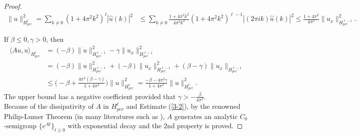 \documentclass[10pt,a4paper,final]{article}
\numberwithin{equation}{section}
\newcommand{\Z}{\mathbb{Z}}
\newcommand{\cF}{\mathcal{F}}
\newcommand{\Gb}{\beta}
\newcommand{\Gg}{\gamma}
\newcommand{\Gl}{\lambda}
\begin{document}
\begin{proof}
\begin{align*}
    \|u\|_{H^{\ell}_{per}}^2=\sum_{k\neq 0} (1+4\pi^2 k^2)^{\ell}|\widehat{u}(k)|^2 &\leq \sum_{k\neq 0} \frac{1+4\pi^2k^2}{4\pi^2k^2} (1+4\pi^2 k^2)^{\ell-1}|(2\pi i k)\widehat{u}(k)|^2\leq \frac{1+4\pi^2}{4\pi^2}\|u_x\|_{H^{\ell-1}_{per}}^2.
\end{align*}


If $\beta\leq 0, \gamma>0$, then 
\begin{align*}
    \langle Au,u\rangle_{H^\ell_{per}}&=(-\beta)\|u\|_{H^{\ell-1}_{per}}^2-\gamma\|u_x\|_{H^{\ell-1}_{per}}^2\\
    &=(-\Gb)\|u\|_{H^{\ell-1}_{per}}^2+(-\Gb)\|u_x\|_{H^{\ell-1}_{per}}^2+(\Gb-\Gg)\|u_x\|_{H^{\ell-1}_{per}} \\&\leq \bigg(-\beta+\frac{4\pi^2(\Gb-\Gg)}{1+4\pi^2}\bigg )\|u\|_{H^{\ell}_{per}}^2=\frac{-\Gb-4\pi^2\Gg}{1+4\pi^2}\|u\|_{H^{\ell}_{per}}^2.
\end{align*}
The upper bound has a negative coefficient provided that $\Gg>-\frac{\Gb}{4\pi^2}$. \\

Because of the dissipativity of $A$ in $H_{per}^\ell$ and Estimate (\ref{3-2}), by the renowned Philip-Lumer Theorem (in many literatures such as \cite{LZ}), $A$ generates an analytic $C_0$-semigroup $\{e^{At}\}_{t\ge0}$ with exponential decay and the 2nd property is proved. 
\end{proof}


\end{document}
